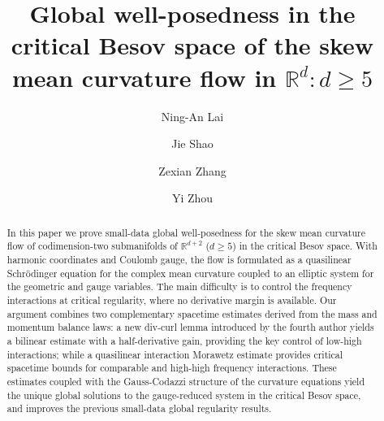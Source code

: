 \documentclass[11pt,letterpaper,reqno]{amsart}
\numberwithin{equation}{section}
\theoremstyle{definition}
\theoremstyle{remark}
\begin{document}
\title[GLW in the critical Besov space of SMCF in $\mathbb{R}^d: d\ge 5$]{Global well-posedness in the critical Besov space of the skew mean curvature flow in $\mathbb{R}^d: d\ge 5$}



\author{Ning-An Lai}
\address{Department of Mathematics, Shaoxing University, Shaoxing 312000, China}


\author{Jie Shao}
\address{School of Mathematics and Statistics, Hunan Normal University, Changsha
	410081, China}

\author{Zexian Zhang}
\address{School of Mathematical Sciences, Fudan University, Shanghai 200433, China}
\author{Yi Zhou}
\address{School of Mathematical Sciences, Fudan University, Shanghai 200433, China}






\begin{abstract}
In this paper we prove small-data global well-posedness for the skew mean curvature flow of codimension-two submanifolds of \(\mathbb R^{d+2}\) (\(d\ge5\)) in the critical Besov space. With harmonic coordinates and Coulomb gauge, the flow is formulated as a quasilinear Schrödinger equation for the complex mean curvature coupled to an elliptic system for the geometric and gauge variables. The main difficulty is to control the frequency interactions at critical regularity, where no derivative margin is available. Our argument combines two complementary spacetime estimates derived from the mass and momentum balance laws: a new div-curl lemma introduced by the fourth author yields a bilinear estimate with a half-derivative gain, providing the key control of low-high interactions; while a quasilinear interaction Morawetz estimate provides critical spacetime bounds for comparable and high-high frequency interactions. These estimates coupled with the Gauss-Codazzi structure of the curvature equations yield the unique global solutions to the gauge-reduced system in the critical Besov space, and improves the previous small-data global regularity results.






\end{abstract}
\end{document}
